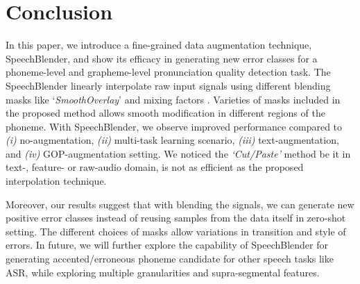 \documentclass{INTERSPEECH2023}
\begin{document}
\section{Conclusion} \label{sec:conclusion}

In this paper, we introduce a fine-grained data augmentation technique, SpeechBlender, and show its efficacy in generating new error classes for a phoneme-level and grapheme-level pronunciation quality detection task. The SpeechBlender linearly interpolate raw input signals using different blending masks like `\textit{SmoothOverlay}' and mixing factors . Varieties of masks included in the proposed method allows smooth modification in different regions of the phoneme.  
With SpeechBlender, we observe improved performance compared to \textit{(i)} no-augmentation, \textit{(ii)} multi-task learning scenario, \textit{(iii)} text-augmentation, and \textit{(iv)} GOP-augmentation setting. We noticed the \textit{`Cut/Paste'} method be it in text-, feature- or raw-audio domain, is not as efficient as the proposed interpolation technique. 



Moreover, our results suggest that with blending the signals, we can generate new positive error classes instead of reusing samples from the data itself in zero-shot setting. The different choices of masks allow variations in transition and style of errors. In future, we will further explore the capability of SpeechBlender for generating accented/erroneous phoneme candidate for other speech tasks like ASR, while exploring multiple granularities and supra-segmental features.





\end{document}
